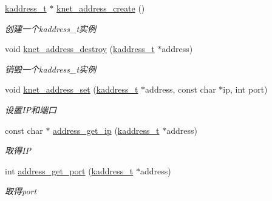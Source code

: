 \begin{DoxyCompactItemize}
\item 
\hyperlink{a00056_a44e99fab0348ec54cfee119ddd9ceed6_a44e99fab0348ec54cfee119ddd9ceed6}{kaddress\+\_\+t} $\ast$ \hyperlink{a00044_a1a1e0dffc03ea50995d5db10e17865f5_a1a1e0dffc03ea50995d5db10e17865f5}{knet\+\_\+address\+\_\+create} ()
\begin{DoxyCompactList}\small\item\em 创建一个kaddress\+\_\+t实例 \end{DoxyCompactList}\item 
void \hyperlink{a00044_a6d8753e0c57b30294243ee26881e7650_a6d8753e0c57b30294243ee26881e7650}{knet\+\_\+address\+\_\+destroy} (\hyperlink{a00056_a44e99fab0348ec54cfee119ddd9ceed6_a44e99fab0348ec54cfee119ddd9ceed6}{kaddress\+\_\+t} $\ast$address)
\begin{DoxyCompactList}\small\item\em 销毁一个kaddress\+\_\+t实例 \end{DoxyCompactList}\item 
void \hyperlink{a00044_a929d17892b34acdbdbc1ff8e8d0f9c71_a929d17892b34acdbdbc1ff8e8d0f9c71}{knet\+\_\+address\+\_\+set} (\hyperlink{a00056_a44e99fab0348ec54cfee119ddd9ceed6_a44e99fab0348ec54cfee119ddd9ceed6}{kaddress\+\_\+t} $\ast$address, const char $\ast$ip, int port)
\begin{DoxyCompactList}\small\item\em 设置\+I\+P和端口 \end{DoxyCompactList}\item 
const char $\ast$ \hyperlink{a00111_gaa1ea22192168bb6baea88feeb20eb601_gaa1ea22192168bb6baea88feeb20eb601}{address\+\_\+get\+\_\+ip} (\hyperlink{a00056_a44e99fab0348ec54cfee119ddd9ceed6_a44e99fab0348ec54cfee119ddd9ceed6}{kaddress\+\_\+t} $\ast$address)
\begin{DoxyCompactList}\small\item\em 取得\+I\+P \end{DoxyCompactList}\item 
int \hyperlink{a00111_ga9acaa00fe11bcecadea350baf9da7172_ga9acaa00fe11bcecadea350baf9da7172}{address\+\_\+get\+\_\+port} (\hyperlink{a00056_a44e99fab0348ec54cfee119ddd9ceed6_a44e99fab0348ec54cfee119ddd9ceed6}{kaddress\+\_\+t} $\ast$address)
\begin{DoxyCompactList}\small\item\em 取得port \end{DoxyCompactList}\end{DoxyCompactItemize}



